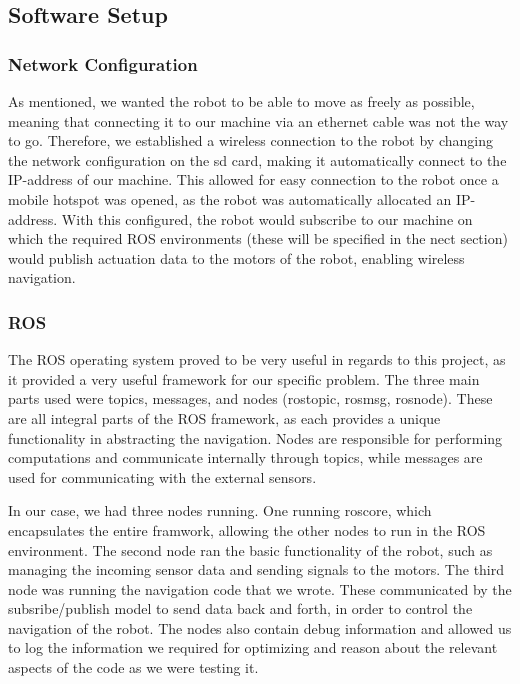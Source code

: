 \documentclass[conference]{IEEEtran}
\begin{document}
\subsection{Software Setup}

\subsubsection{Network Configuration}
As mentioned, we wanted the robot to be able to move as freely as possible, meaning that connecting it to our machine via an ethernet cable was not the way to go.
Therefore, we established a wireless connection to the robot by changing the network configuration on the sd card, making it automatically connect to the IP-address of our machine.
This allowed for easy connection to the robot once a mobile hotspot was opened, as the robot was automatically allocated an IP-address.
With this configured, the robot would subscribe to our machine on which the required ROS environments (these will be specified in the nect section) would publish actuation data to the motors of the robot, enabling wireless navigation.

\subsubsection{ROS}

The ROS operating system proved to be very useful in regards to this project, as it provided a very useful framework for our specific problem.
The three main parts used were topics, messages, and nodes (rostopic, rosmsg, rosnode). These are all integral parts of the ROS framework, as each provides a unique functionality in abstracting the navigation.
Nodes are responsible for performing computations and communicate internally through topics, while messages are used for communicating with the external sensors.

In our case, we had three nodes running. One running roscore, which encapsulates the entire framwork, allowing the other nodes to run in the ROS environment.
The second node ran the basic functionality of the robot, such as managing the incoming sensor data and sending signals to the motors.
The third node was running the navigation code that we wrote. These communicated by the subsribe/publish model to send data back and forth, in order to control the navigation of the robot.
The nodes also contain debug information and allowed us to log the information we required for optimizing and reason about the relevant aspects of the code as we were testing it.
\end{document}

